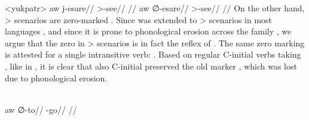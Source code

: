 \pex<yukpatr>\yukpa \parencite[][139]{meira2006syntactic}
\begingl
\gla aw j-esare//
\glb {} >-see//
\glft {}//
\endgl
{}
\begingl
\gla aw {\normalfont ∅}-esare//
\glb {} >-see//
\glft {}//
\endgl
\xe
On the other hand, > scenarios are zero-marked .
Since \PC {}  was extended to > scenarios in most languages \parencite[81--82]{gildea1998}, and since it is prone to phonological erosion across the family , we argue that the zero in > scenarios is in fact the \yukpa reflex of .
The same zero marking is attested for a single intransitive verb:   .
Based on regular C-initial verbs taking , like  in , it is clear that also C-initial   preserved the old  marker , which was lost due to phonological erosion.

\yukpa \parencite[][139]{meira2006syntactic}\\
\begingl
\gla aw {\normalfont ∅}-to//
\glb {} -go//
\glft {}//
\endgl
\xe